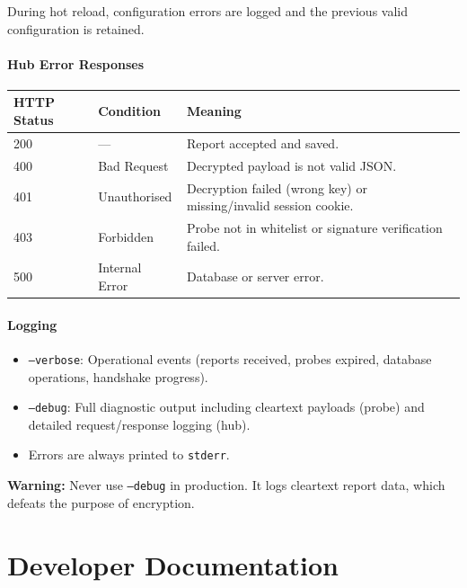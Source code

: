 \documentclass[12pt]{report}
\begin{document}
During hot reload, configuration errors are logged and the previous valid
configuration is retained.

\subsection{Hub Error Responses}

\begin{longtable}{@{} l l p{5cm} @{}}
\toprule
\textbf{HTTP Status} & \textbf{Condition} & \textbf{Meaning} \\
\midrule
200 & --- & Report accepted and saved. \\
400 & Bad Request & Decrypted payload is not valid JSON. \\
401 & Unauthorised & Decryption failed (wrong key) or missing/invalid
    session cookie. \\
403 & Forbidden & Probe not in whitelist or signature verification failed. \\
500 & Internal Error & Database or server error. \\
\bottomrule
\end{longtable}

\subsection{Logging}

\begin{itemize}
    \item \texttt{--verbose}: Operational events (reports received, probes
          expired, database operations, handshake progress).
    \item \texttt{--debug}: Full diagnostic output including cleartext
          payloads (probe) and detailed request/response logging (hub).
    \item Errors are always printed to \texttt{stderr}.
\end{itemize}

\textcolor{warnorange}{\textbf{Warning:}} Never use \texttt{--debug} in
production. It logs cleartext report data, which defeats the purpose of
encryption.


\part{Developer Documentation}
\setcounter{section}{0}
\end{document}
